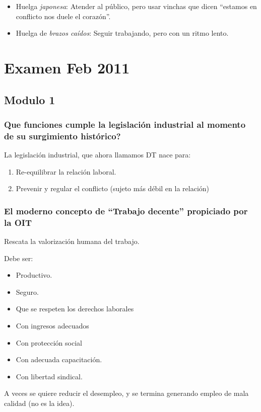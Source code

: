 \documentclass[spanish,12pt,a4paper,titlepage]{report}
\begin{document}
\begin{itemize}
\item Huelga \textit{japonesa}: Atender al público, pero usar vinchas que dicen ``estamos en conflicto nos duele el corazón''.
\item Huelga de \textit{brazos caídos}: Seguir trabajando, pero con un ritmo lento.
\end{itemize}

\chapter{Examen Feb 2011}

\section{Modulo 1}

\subsection{Que funciones cumple la legislación industrial al momento de su surgimiento histórico?}

La legislación industrial, que ahora llamamos DT nace para:
\begin{enumerate}
\item Re-equilibrar la relación laboral.
\item Prevenir y regular el conflicto (sujeto más débil en la relación)
\end{enumerate}

\subsection{El moderno concepto de ``Trabajo decente'' propiciado por la OIT}

Rescata la valorización humana del trabajo.

Debe ser:
\begin{itemize}
\item Productivo.
\item Seguro.
\item Que se respeten los derechos laborales
\item Con ingresos adecuados
\item Con protección social
\item Con adecuada capacitación.
\item Con libertad sindical.
\end{itemize}

A veces se quiere reducir el desempleo, y se termina generando empleo de mala calidad (no es la idea).
\end{document}
